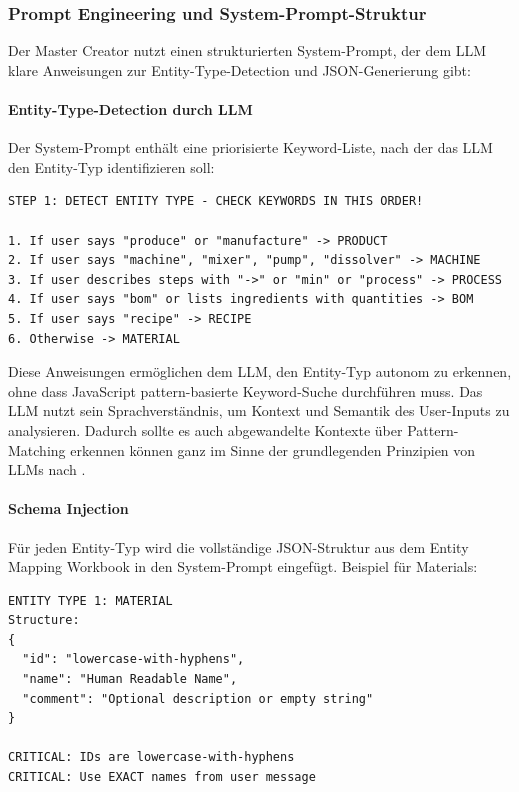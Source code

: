 \subsubsection{Prompt Engineering und System-Prompt-Struktur}

Der Master Creator nutzt einen strukturierten System-Prompt, der dem LLM klare Anweisungen zur Entity-Type-Detection und JSON-Generierung gibt:

\paragraph{Entity-Type-Detection durch LLM}

Der System-Prompt enthält eine priorisierte Keyword-Liste, nach der das LLM den Entity-Typ identifizieren soll:

\begin{verbatim}
STEP 1: DETECT ENTITY TYPE - CHECK KEYWORDS IN THIS ORDER!

1. If user says "produce" or "manufacture" -> PRODUCT
2. If user says "machine", "mixer", "pump", "dissolver" -> MACHINE
3. If user describes steps with "->" or "min" or "process" -> PROCESS
4. If user says "bom" or lists ingredients with quantities -> BOM
5. If user says "recipe" -> RECIPE
6. Otherwise -> MATERIAL
\end{verbatim}

\noindent Diese Anweisungen ermöglichen dem LLM, den Entity-Typ autonom zu erkennen, ohne dass JavaScript pattern-basierte Keyword-Suche durchführen muss. Das LLM nutzt sein Sprachverständnis, um Kontext und Semantik des User-Inputs zu analysieren. Dadurch sollte es auch abgewandelte Kontexte über Pattern-Matching erkennen können ganz im Sinne der grundlegenden Prinzipien von LLMs nach \cite{brown2020language}.

\paragraph{Schema Injection}

Für jeden Entity-Typ wird die vollständige JSON-Struktur aus dem Entity Mapping Workbook in den System-Prompt eingefügt. Beispiel für Materials:

\begin{verbatim}
ENTITY TYPE 1: MATERIAL
Structure:
{
  "id": "lowercase-with-hyphens",
  "name": "Human Readable Name",
  "comment": "Optional description or empty string"
}

CRITICAL: IDs are lowercase-with-hyphens
CRITICAL: Use EXACT names from user message
\end{verbatim}

